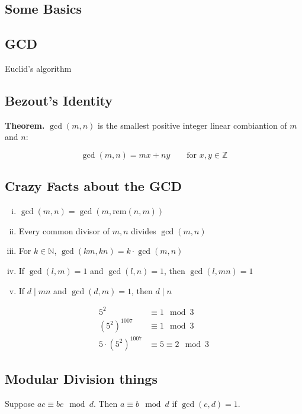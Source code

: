 \documentclass{article}
\begin{document}
\subsection*{Some Basics}

\subsection*{GCD}

Euclid's algorithm

\subsection*{Bezout's Identity}

\textbf{Theorem.} $\gcd(m,n)$ is the smallest positive integer linear combiantion of $m$ and $n$:

$$\gcd(m,n) = mx + ny \qquad \text{for } x,y \in \mathbb{Z}$$

\subsection*{Crazy Facts about the GCD}

\begin{enumerate}[(i)]
  \item $\gcd(m,n) = \gcd(m,\text{rem}(n,m))$
  \item Every common divisor of $m, n$ divides $\gcd(m,n)$
  \item For $k \in \mathbb{N}$, $\gcd(km, kn) = k\cdot \gcd(m,n)$
  \item If $\gcd(l,m) = 1$ and $\gcd(l,n) = 1$, then $\gcd(l,mn) = 1$
  \item If $d \mid mn$ and $\gcd(d,m) = 1$, then $d \mid n$
\end{enumerate}


\bigskip

\begin{align*}
  5^2 &\equiv 1 \mod 3 \\
  (5^2)^{1007} &\equiv 1 \mod 3 \\
  5 \cdot (5^2)^{1007} &\equiv 5 \equiv 2 \mod 3
\end{align*}

\subsection*{Modular Division things}

Suppose $ac \equiv bc \mod d$. Then $a \equiv b \mod d$ if $\gcd(c,d) = 1$.
\end{document}
